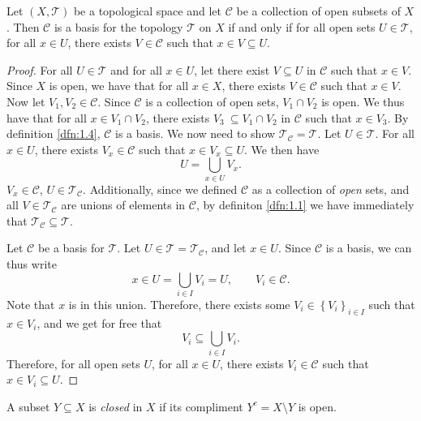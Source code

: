 \begin{proposition}\label{prp:1.2}
	Let $(X,\mathcal{T} )$ be a topological space and let $\mathcal{C} $ be a collection of open subsets of $X$. Then $\mathcal{C} $ is a basis for the topology $\mathcal{T} $ on $X$ if and only if for all open sets $U\in \mathcal{T} $, for all $x\in U$, there exists $V\in \mathcal{C} $ such that $x\in V \subseteq U$.
\end{proposition}
\begin{proof}
	For all $U\in \mathcal{T} $ and for all $x\in U$, let there exist $V\subseteq U$ in $\mathcal{C} $ such that $x\in V$. Since $X$ is open, we have that for all $x\in X$, there exists $V\in \mathcal{C} $ such that $x\in V$. Now let $V_1,V_2\in \mathcal{C} $. Since $\mathcal{C} $ is a collection of open sets, $V_1 \cap V_2$ is open. We thus have that for all $x\in V_1 \cap V_2$, there exists $V_3\ \subseteq V_1 \cap V_2$ in $\mathcal{C} $ such that $x\in V_3$. By definition \ref{dfn:1.4}, $\mathcal{C} $ is a basis. We now need to show $\mathcal{T} _{\mathcal{C} }=\mathcal{T}  $. Let $U\in \mathcal{T} $. For all $x\in U$, there exists $V_x\in \mathcal{C} $ such that $x\in V_x \subseteq U$. We then have
	\[
		U= \bigcup_{x\in U} V_x
	.\]
	$V_x\in \mathcal{C} $, $U\in \mathcal{T} _{\mathcal{C} } $. Additionally, since we defined $\mathcal{C} $ as a collection of \emph{open} sets, and all $V\in \mathcal{T} _{\mathcal{C} } $ are unions of elements in $\mathcal{C} $, by definiton \ref{dfn:1.1} we have immediately that $\mathcal{T} _{\mathcal{C} } \subseteq \mathcal{T} $.

	Let $\mathcal{C} $ be a basis for $\mathcal{T} $. Let $U\in \mathcal{T} =\mathcal{T} _{\mathcal{C} } $, and let $x\in U$. Since $\mathcal{C} $ is a basis, we can thus write
	\[
		x\in U= \bigcup_{i\in I} V_i = U,\qquad V_i\in \mathcal{C} 
	.\]
	Note that $x$ is in this union. Therefore, there exists some $V_i\in \left\{ V_i \right\}_{i\in I} $ such that $x\in V_i$, and we get for free that
	\[
		V_i \subseteq \bigcup_{i\in I} V_i
	.\]
	Therefore, for all open sets $U$, for all $x\in U$, there exists $V_i \in \mathcal{C} $ such that $x\in V_i \subseteq U$.
\end{proof}

\begin{definition}[Closed]\label{dfn:1.6}
	A subset $Y\subseteq X$ is \emph{closed} in $X$ if its compliment $Y^{c} =X\setminus Y$ is open.
\end{definition}

